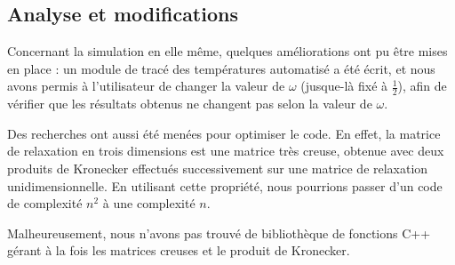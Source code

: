 \documentclass[../PS6_RapportFinal.tex]{subfiles}
\begin{document}
\graphicspath{{img/}{tex/img/}}
\subsection{Analyse et modifications}

Concernant la simulation en elle même, quelques améliorations ont pu être mises en place : un module de tracé des températures automatisé a été écrit, et nous avons permis à l'utilisateur de changer la valeur de $\omega$ (jusque-là fixé à $\frac{1}{2}$), afin de vérifier que les résultats obtenus ne changent pas selon la valeur de $\omega$.

Des recherches ont aussi été menées pour optimiser le code. En effet, la matrice de relaxation en trois dimensions est une matrice très creuse, obtenue avec deux produits de Kronecker effectués successivement sur une matrice de relaxation unidimensionnelle. En utilisant cette propriété, nous pourrions passer d'un code de complexité $n^{2}$ à une complexité $n$.

Malheureusement, nous n'avons pas trouvé de bibliothèque de fonctions C++ gérant à la fois les matrices creuses et le produit de Kronecker.
\end{document}
